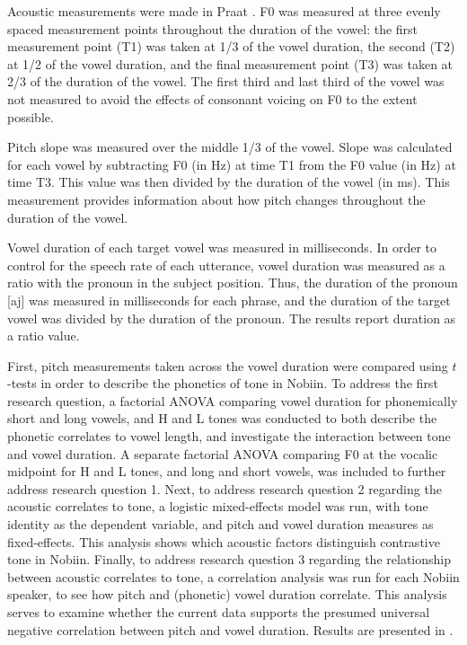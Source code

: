 \documentclass[output=paper]{langscibook}
\begin{document}
Acoustic measurements were made in Praat \citep{Boersma2017}. F0 was measured at three evenly spaced measurement points throughout the duration of the vowel: the first measurement point (T1) was taken at 1/3 of the vowel duration, the second (T2) at 1/2 of the vowel duration, and the final measurement point (T3) was taken at 2/3 of the duration of the vowel. The first third and last third of the vowel was not measured to avoid the effects of consonant voicing on F0 to the extent possible. 

Pitch slope was measured over the middle 1/3 of the vowel. Slope was calculated for each vowel by subtracting F0 (in Hz) at time T1 from the F0 value (in Hz) at time T3. This value was then divided by the duration of the vowel (in ms). This measurement provides information about how pitch changes throughout the duration of the vowel.


Vowel duration of each target vowel was measured in milliseconds. In order to control for the speech rate of each utterance, vowel duration was measured as a ratio with the pronoun in the subject position. Thus, the duration of the pronoun [aj] was measured in milliseconds for each phrase, and the duration of the target vowel was divided by the duration of the pronoun. The results report duration as a ratio value. 

First, pitch measurements taken across the vowel duration were compared using $t$-tests in order to describe the phonetics of tone in Nobiin. To address the first research question, a factorial ANOVA comparing vowel duration for phonemically short and long vowels, and H and L tones was conducted to both describe the phonetic correlates to vowel length, and investigate the interaction between tone and vowel duration. A separate factorial ANOVA comparing F0 at the vocalic midpoint for H and L tones, and long and short vowels, was included to further address research question 1. Next, to address research question 2 regarding the acoustic correlates to tone, a logistic mixed-effects model was run, with tone identity as the dependent variable, and pitch and vowel duration measures as fixed-effects. This analysis shows which acoustic factors distinguish contrastive tone in Nobiin. Finally, to address research question 3 regarding the relationship between acoustic correlates to tone, a correlation analysis was run for each Nobiin speaker, to see how pitch and (phonetic) vowel duration correlate. This analysis serves to examine whether the current data supports the presumed universal negative correlation between pitch and vowel duration. Results are presented in .
\end{document}
